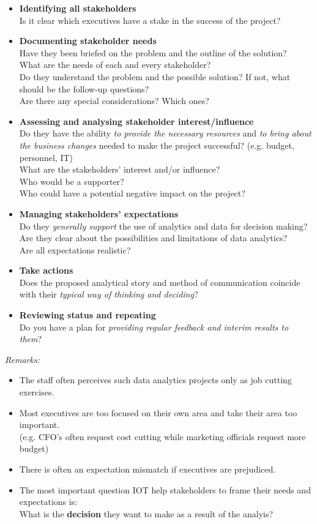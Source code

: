 \documentclass[a4paper, landscape, 6pt, fleqn]{scrartcl}
\renewcommand{\emph}[1]{\textbf{#1}}
\begin{document}
\begin{multicols*}{4}
\begin{itemize}
\item \emph{Identifying all stakeholders} \\
Is it clear which executives have a stake in the success of the project?
\item \emph{Documenting stakeholder needs} \\
Have they been briefed on the problem and the outline of the solution? \\
What are the needs of each and every stakeholder? \\
Do they understand the problem and the possible solution? If not, what should be the follow-up questions? \\
Are there any special considerations? Which ones?
\item \emph{Assessing and analysing stakeholder interest/influence} \\
Do they have the ability \textit{to provide the necessary resources} and \textit{to bring about the business changes} needed to make the project successful? (e.g. budget, personnel, IT) \\
What are the stakeholders' interest and/or influence? \\
Who would be a supporter? \\
Who could have a potential negative impact on the project?
\item \emph{Managing stakeholders' expectations} \\
Do they \textit{generally support} the use of analytics and data for decision making? \\
Are they clear about the possibilities and limitations of data analytics? \\
Are all expectations realistic?
\item \emph{Take actions} \\
Does the proposed analytical story and method of communication coincide with their \textit{typical way of thinking and deciding}?
\item \emph{Reviewing status and repeating} \\
Do you have a plan for \textit{providing regular feedback and interim results to them}?
\end{itemize}

\textit{Remarks:}
\begin{itemize}
\item The staff often perceives such data analytics projects only as job cutting exercises.
\item Most executives are too focused on their own area and take their area too important. \\
(e.g. CFO's often request cost cutting while marketing officials request more budget)
\item There is often an expectation mismatch if executives are prejudiced.
\item The most important question IOT help stakeholders to frame their needs and expectations is: \\
What is the \emph{decision} they want to make as a result of the analyis?
\end{itemize}


\end{multicols*}
\end{document}
